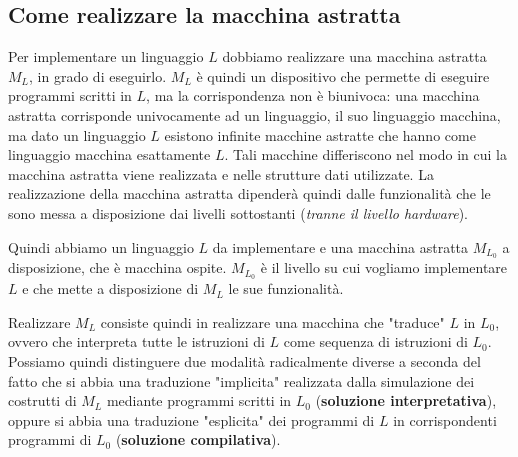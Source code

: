 \documentclass[oneside,a4paper,11pt]{book}
\theoremstyle{italicstyle}
\theoremstyle{normStyle}
\begin{document}
\subsection{Come realizzare la macchina astratta}
Per implementare un linguaggio $L$ dobbiamo realizzare una macchina astratta $M_L$, 
in grado di eseguirlo. $M_L$ è quindi un dispositivo che permette di eseguire programmi 
scritti in $L$, ma la corrispondenza non è biunivoca: una macchina astratta corrisponde univocamente 
ad un linguaggio, il suo linguaggio macchina, ma dato un linguaggio $L$ 
esistono infinite macchine astratte che hanno come linguaggio macchina 
esattamente $L$. Tali macchine differiscono nel modo in cui la macchina astratta viene realizzata 
e nelle strutture dati utilizzate. La realizzazione della macchina astratta 
dipenderà quindi dalle funzionalità che le sono messa a disposizione 
dai livelli sottostanti (\textit{tranne il livello hardware}).

Quindi abbiamo un linguaggio $L$ da implementare e una macchina astratta $M_{L_0}$ a disposizione, che 
è macchina ospite. $M_{L_0}$ è il livello su cui vogliamo implementare $L$ e che mette a disposizione 
di $M_L$ le sue funzionalità.

Realizzare $M_L$ consiste quindi in realizzare una macchina che "traduce"
$L$ in $L_0$, ovvero che interpreta tutte le istruzioni di $L$ come sequenza di 
istruzioni di $L_0$. Possiamo quindi distinguere due modalità radicalmente 
diverse a seconda del fatto che si abbia una traduzione "implicita" realizzata 
dalla simulazione dei costrutti di $M_L$ mediante programmi scritti in $L_0$ 
(\textbf{soluzione interpretativa}), oppure si abbia una traduzione "esplicita" dei 
programmi di $L$ in corrispondenti programmi di $L_0$ (\textbf{soluzione compilativa}).
\end{document}
